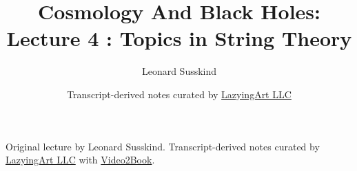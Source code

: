 \documentclass[11pt,oneside]{book}
\begin{document}
\frontmatter
\title{Cosmology And Black Holes: Lecture 4 : Topics in String Theory}
\author{Leonard Susskind}
\date{Transcript-derived notes curated by \href{https://lazying.art}{LazyingArt LLC}}
\maketitle
\begin{center}
\small Original lecture by Leonard Susskind. Transcript-derived notes curated by \href{https://lazying.art}{LazyingArt LLC} with \href{https://github.com/lachlanchen/Video2Book}{Video2Book}.
\end{center}
\clearpage
\mainmatter

\end{document}
